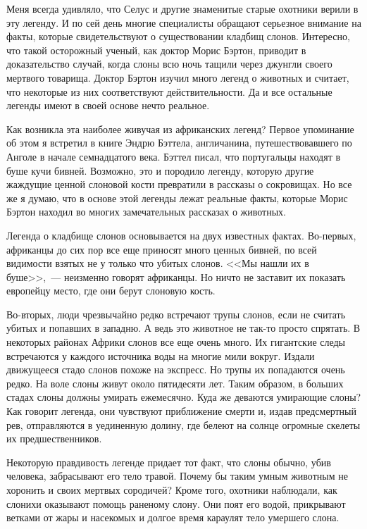 \documentclass[12pt,a4paper,twoside,openany,svgnames]{memoir}
\begin{document}
Меня всегда удивляло, что Селус и другие знаменитые старые охотники верили в эту легенду. И по сей день многие специалисты обращают серьезное внимание на факты, которые свидетельствуют о существовании кладбищ слонов. Интересно, что такой осторожный ученый, как доктор Морис Бэртон, приводит в доказательство случай, когда слоны всю ночь тащили через джунгли своего мертвого товарища. Доктор Бэртон изучил много легенд о животных и считает, что некоторые из них соответствуют действительности. Да и все остальные легенды имеют в своей основе нечто реальное.

Как возникла эта наиболее живучая из африканских легенд? Первое упоминание об этом я встретил в книге Эндрю Бэттела, англичанина, путешествовавшего по Анголе в начале семнадцатого века. Бэттел писал, что португальцы находят в буше кучи бивней. Возможно, это и породило легенду, которую другие жаждущие ценной слоновой кости превратили в рассказы о сокровищах. Но все же я думаю, что в основе этой легенды лежат реальные факты, которые Морис Бэртон находил во многих замечательных рассказах о животных.

Легенда о кладбище слонов основывается на двух известных фактах. Во-первых, африканцы до сих пор все еще приносят много ценных бивней, по всей видимости взятых не у только что убитых слонов. <<Мы нашли их в буше>>,~--- неизменно говорят африканцы. Но ничто не заставит их показать европейцу место, где они берут слоновую кость.

Во-вторых, люди чрезвычайно редко встречают трупы слонов, если не считать убитых и попавших в западню. А ведь это животное не так-то просто спрятать. В некоторых районах Африки слонов все еще очень много. Их гигантские следы встречаются у каждого источника воды на многие мили вокруг. Издали движущееся стадо слонов похоже на экспресс. Но трупы их попадаются очень редко. На воле слоны живут около пятидесяти лет. Таким образом, в больших стадах слоны должны умирать ежемесячно. Куда же деваются умирающие слоны? Как говорит легенда, они чувствуют приближение смерти и, издав предсмертный рев, отправляются в уединенную долину, где белеют на солнце огромные скелеты их предшественников.

Некоторую правдивость легенде придает тот факт, что слоны обычно, убив человека, забрасывают его тело травой. Почему бы таким умным животным не хоронить и своих мертвых сородичей? Кроме того, охотники наблюдали, как слонихи оказывают помощь раненому слону. Они поят его водой, прикрывают ветками от жары и насекомых и долгое время караулят тело умершего слона.
\end{document}
